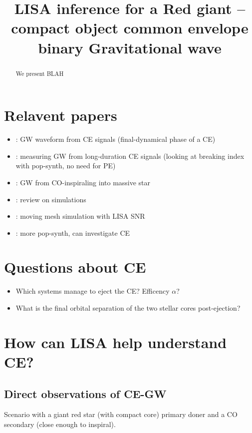 \documentclass[floatfix,ApJL, twocolumn]{aastex631}
\begin{document}
\title{LISA inference for a Red giant -- compact object common envelope binary Gravitational wave}







\begin{abstract}
We present BLAH
\end{abstract}




\section{Relavent papers}
\begin{itemize}
    \item \cite{Ginat:2020:MNRAS}: GW waveform from CE signals (final-dynamical phase of a CE)
    \item \cite{Renzo:2021:ApJ}: measuring GW from long-duration CE signals (looking at breaking index with pop-synth, no need for PE)
    \item \cite{Raveh:2021:MNRAS}: GW from CO-inspiraling into massive star
    \item \cite{Roepke:2022:arXiv}: review on simulations
    \item \cite{Ohlmann:2016:ApJL}: moving mesh simulation with LISA SNR
    \item \cite{Wagg:2022:ApJ}: more pop-synth, can investigate CE
\end{itemize}


\section{Questions about CE}
\begin{itemize}
    \item Which systems manage to eject the CE? Efficency $\alpha$?
    \item What is the final orbital separation of the two stellar cores post-ejection?
\end{itemize}


\section{How can LISA help understand CE?}
\subsection{Direct observations of CE-GW}
Scenario with a giant red star (with compact core) primary doner and a CO secondary (close enough to inspiral).
\end{document}
